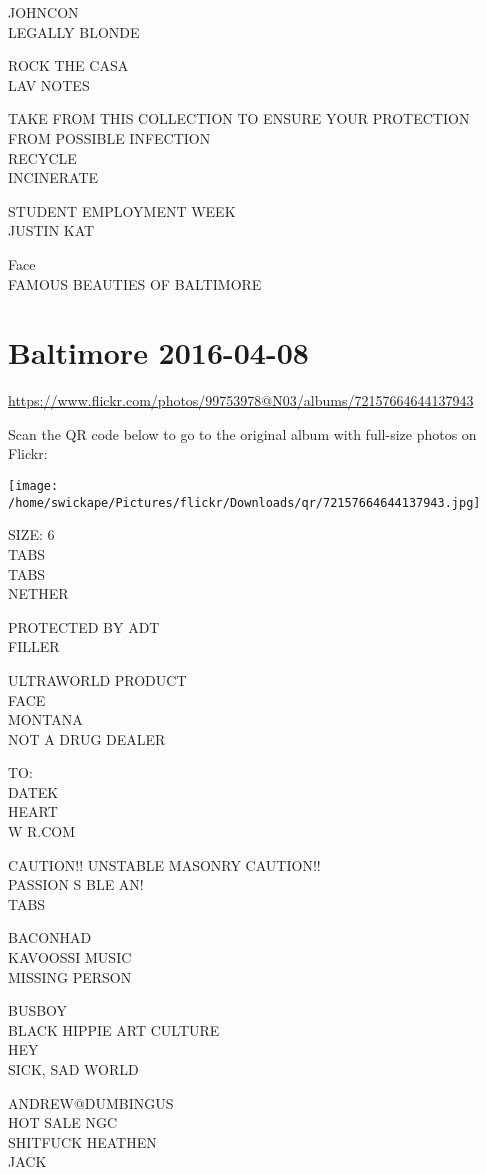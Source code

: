 \documentclass[10pt,letterpaper]{article}
\begin{document}
JOHNCON\\
LEGALLY BLONDE

ROCK THE CASA\\
LAV NOTES

TAKE FROM THIS COLLECTION TO ENSURE YOUR PROTECTION FROM POSSIBLE INFECTION\\
RECYCLE\\
INCINERATE

STUDENT EMPLOYMENT WEEK\\
JUSTIN KAT

Face\\
FAMOUS BEAUTIES OF BALTIMORE


\section*{Baltimore 2016-04-08}

\url{https://www.flickr.com/photos/99753978@N03/albums/72157664644137943}

Scan the QR code below to go to the original album with full-size photos on Flickr:

\texttt{[image: /home/swickape/Pictures/flickr/Downloads/qr/72157664644137943.jpg]}


SIZE: 6\\
TABS\\
TABS\\
NETHER

PROTECTED BY ADT\\
FILLER

ULTRAWORLD PRODUCT\\
FACE\\
MONTANA\\
NOT A DRUG DEALER

TO:\\
DATEK\\
HEART\\
W R.COM

CAUTION!! UNSTABLE MASONRY CAUTION!!\\
PASSION S BLE AN!\\
TABS

BACONHAD\\
KAVOOSSI MUSIC\\
MISSING PERSON

BUSBOY\\
BLACK HIPPIE ART CULTURE\\
HEY\\
SICK, SAD WORLD

ANDREW@DUMBINGUS\\
HOT SALE NGC\\
SHITFUCK HEATHEN\\
JACK
\end{document}
